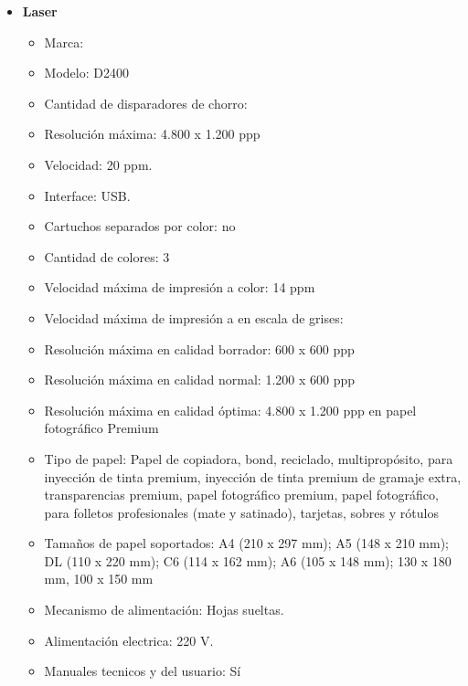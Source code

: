 \begin{enumerate}
\begin{itemize}
    \item \textbf{Laser}
    \begin{itemize}
      \item Marca: 
      \item Modelo: D2400
      \item Cantidad de disparadores de chorro: 
      
      \item Resolución máxima: 4.800 x 1.200 ppp
      \item Velocidad: 20 ppm.
      \item Interface: USB.
      
      \item Cartuchos separados por color: no
      \item Cantidad de colores: 3
      \item Velocidad máxima de impresión a color: 14 ppm
      \item Velocidad máxima de impresión a en escala de grises:
      \item Resolución máxima en calidad borrador: 600 x 600 ppp
      \item Resolución máxima en calidad normal: 1.200 x 600 ppp
      \item Resolución máxima en calidad óptima: 4.800 x 1.200 ppp en papel fotográfico Premium
      
      \item Tipo de papel: Papel de copiadora, bond, reciclado, multipropósito, para inyección de tinta premium, inyección de tinta premium de gramaje extra, transparencias premium, papel fotográfico premium, papel fotográfico, para folletos profesionales (mate y satinado), tarjetas, sobres y rótulos
      \item Tamaños de papel soportados: A4 (210 x 297 mm); A5 (148 x 210 mm); DL (110 x 220 mm); C6 (114 x 162 mm); A6 (105 x 148 mm); 130 x 180 mm, 100 x 150 mm
      \item Mecanismo de alimentación: Hojas sueltas.
      
      \item Alimentación electrica: 220 V.
      \item Manuales tecnicos y del usuario: Sí
    \end{itemize}
  \end{itemize}
\end{enumerate} 

